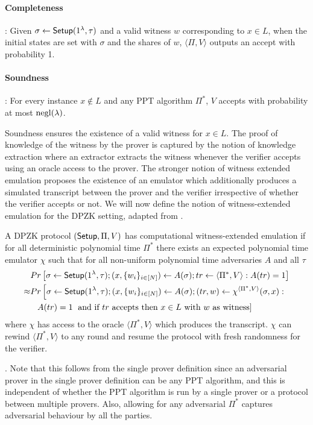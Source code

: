 \paragraph{Completeness}: %
Given $\sigma \gets \mathsf{Setup}(1^{\lambda}, \tau)$ and a valid witness $w$ corresponding to $x \in L$, when the initial states are set with $\sigma$ and the shares of $w$, $\langle \Pi, V \rangle$ outputs an accept with probability 1.

\paragraph{Soundness}:  For every instance $x \notin L$ and any PPT algorithm $\Pi^*$, $V$ accepts with probability at most $\mathrm{negl}({\lambda})$.

Soundness ensures the existence of a valid witness for $x \in L$. The proof of knowledge of the witness by the prover is captured by the notion of knowledge extraction where an extractor extracts the witness whenever the verifier accepts using an oracle access to the prover. The stronger notion of witness extended emulation \cite{Lindell03} proposes the existence of an emulator which additionally produces a simulated transcript between the prover and the verifier irrespective of whether the verifier accepts or not. We will now define the notion of witness-extended emulation for the DPZK setting, adapted from \cite{Groth11}. 
\begin{definition}
A DPZK protocol $(\mathsf{Setup}, \Pi, V)$ has computational witness-extended emulation if for all deterministic polynomial time $\Pi^*$ there exists  an expected polynomial time emulator $\chi$ such that for all non-uniform polynomial time adversaries $A$ and all $\tau$
\begin{align*}
&Pr \left[\sigma \leftarrow \mathsf{Setup}(1^{\lambda}, \tau); (x, \{w_i\}_{i \in [N]}) \leftarrow A(\sigma); tr \leftarrow \langle \Pi^*, V \rangle: A(tr) = 1 \right] \\
\approx &Pr \left[\sigma \leftarrow \mathsf{Setup}(1^{\lambda}, \tau); (x, \{w_i\}_{i \in [N]}) \leftarrow A(\sigma); (tr, w) \leftarrow \chi^{\langle \Pi^*, V \rangle}(\sigma, x): \right. \\
&\;\;\; A(tr) = 1 \left. \text{ and if } tr \text{ accepts then } x \in L \text{ with } w \text{ as witness} \right] 
\end{align*}
where $\chi$ has access to the oracle $\langle \Pi^*, V \rangle$ which produces the transcript. $\chi$ can rewind $\langle \Pi^*, V \rangle$ to any round and resume the protocol with fresh randomness for the verifier.
\end{definition}
.
Note that this follows from the single prover definition since an adversarial prover in the single prover definition can be any PPT algorithm, and this is independent of whether the PPT algorithm is run by a single prover or a protocol between multiple provers.
Also, allowing for any adversarial $\Pi^*$ captures adversarial behaviour by all the parties.

